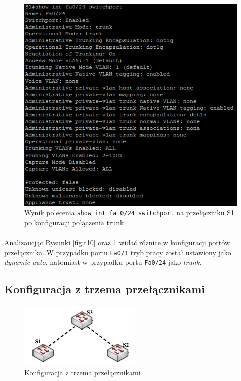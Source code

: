 \documentclass[wide,a4paper,titlepage,12pt] {article}
\begin{document}
  \begin{figure}[H]
    \begin{center}
      \includegraphics[width=\textwidth]{img/t11.PNG}
      \caption{Wynik polecenia \texttt{show int fa 0/24 switchport} na przełączniku S1 po konfiguracji połączenia trunk}
      \label{fig:t11}
    \end{center}
  \end{figure}

  \paragraph{}
  Analizaucjąc Rysunki \ref{fig:t10} oraz \ref{fig:t11} widać różnice w konfiguracji portów przełącznika. W przypadku portu \texttt{Fa0/1} tryb pracy został ustawiony jako \emph{dynamic auto}, natomiast w przypadku portu \texttt{Fa0/24} jako \emph{trunk}.


  \subsection{Konfiguracja z trzema przełącznikami}
  \begin{figure}[H]
    \begin{center}
      \includegraphics[width=\textwidth]{img/cc.PNG}
      \caption{Konfiguracja z trzema przełącznikami}
      \label{fig:cc}
    \end{center}
  \end{figure}
\end{document}
